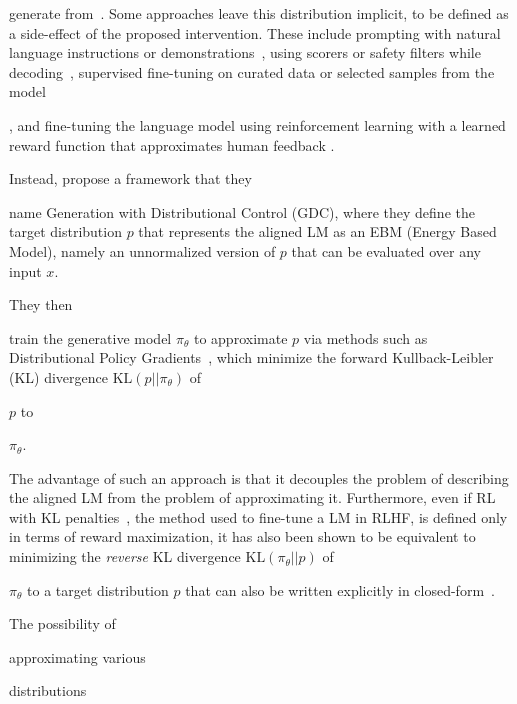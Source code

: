 {generate from}~\cite{korbak2022rlBayesian}. Some approaches leave this distribution {implicit}, to be defined as a side-effect of the proposed intervention. {These} include prompting with natural language instructions or demonstrations~\citep{lab}, using scorers or safety filters while decoding~\citep{recipes,xu2021bot}, supervised fine-tuning on curated data \citep{solaiman2021process,ngo2021_mitigating_harm,weibl2021,chung2022_scaling_instruction} or selected samples from the model 

\cite{star,scheurer2022,cascades}, and fine-tuning the language model using reinforcement learning with a learned reward function that approximates human feedback \citep[Reinforcement Learning from Human Feedback or RLHF;][]{ziegler2019fine,bai2022training,ouyang2022training}.

Instead, \citet{khalifa2021distributional} propose a framework that they 

{name} Generation with Distributional Control (GDC), {where} they define the target distribution {$p$} that represents the aligned LM as an EBM (Energy Based Model), namely an unnormalized version of $p$ that can be evaluated over any input $x$.

They then

{train {the generative model} ${\pi_\theta}$ to approximate $p$} via methods such as {D}istributional {P}olicy {G}radients~\citep[DPG;][]{parshakova2019distributional}, which minimize the forward Kullback-Leibler (KL) divergence $\mathrm{KL}(p|| {\pi_\theta})$ of 

{$p$} to 

{${\pi_\theta}$}.

The advantage of such an approach is that it decouples the problem of describing the aligned LM from the problem of approximating it. Furthermore, even if RL with KL penalties~\citep{todorov,kappen2012optimal,KL_Jaques17,KL_jaquesK19}, {the method used to fine-tune a LM in} RLHF, is defined only in terms of reward maximization, it has also been shown to be equivalent to minimizing the \emph{reverse} KL divergence $\mathrm{KL}({\pi_\theta}|| p)$ of 

{${\pi_\theta}$} 
to a target distribution {$p$} that can also {be written} explicitly in closed-form~\citep{korbak2022reinforcement}.

The possibility of 

{approximating various} 

distributions 

